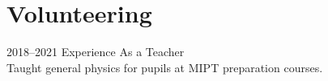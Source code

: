 \documentclass[]{cv-style}          %
\begin{document}
\begin{entrylist}
%
%
%
%

\end{entrylist}


\section{Volunteering}

\begin{entrylist}

\entrySkoltech
    {2018--2021}
    {Experience As a Teacher}
    {\jobtitle{}\\
Taught general physics for pupils at MIPT preparation courses.}

\end{entrylist}



\end{document}
